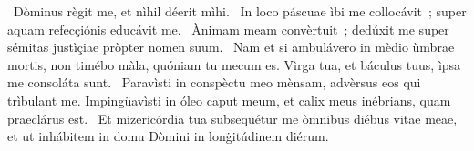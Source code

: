 \psalmChapterWithInscription{}
{ }
{%
~Dòminus règit me, et nìhil déerit mìhi. 
~In loco páscuae ìbi me collocávit~; super aquam refecçiónis educávit me. 
~Ànimam meam convèrtuit~; dedúxit me super sémitas justìçiae pròpter nomen suum. 
~Nam et si ambulávero in mèdio ùmbrae mortis, non timébo màla, quóniam tu mecum es. Vìrga tua, et báculus tuus, ìpsa me consoláta sunt. 
~Paravìsti in conspèctu meo mènsam, advèrsus eos qui trìbulant me. Impingüavìsti in óleo caput meum, et calix meus inébrians, quam praeclárus est. 
~Et mizericórdia tua subsequétur me òmnibus diébus vitae meae, et ut inhábitem in domu Dòmini in lonġitúdinem diérum. 
}
